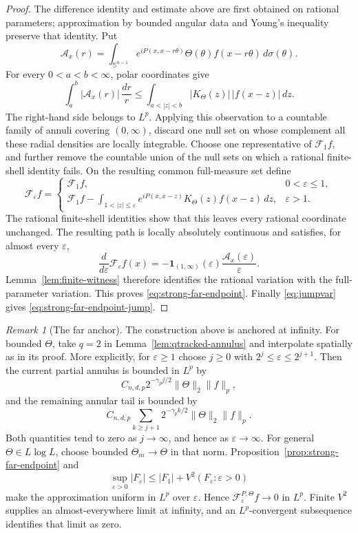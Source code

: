 \documentclass[11pt]{article}
\numberwithin{equation}{section}
\theoremstyle{remark}
\newtheorem{remark}[theorem]{Remark}
\theoremstyle{definition}
\newcommand{\Sph}{\mathbb S}
\newcommand{\cF}{\mathcal F}
\newcommand{\norm}[1]{\lVert #1\rVert}
\begin{document}
\begin{proof}
The difference identity and estimate above are first obtained on rational
parameters; approximation by bounded angular data and Young's inequality
preserve that identity.  Put
\[
 \mathcal A_x(r)=\int_{\Sph^{n-1}}
 e^{iP(x,x-r\theta)}\Theta(\theta)f(x-r\theta)\,d\sigma(\theta).
\]
For every $0<a<b<\infty$, polar coordinates give
\[
 \int_a^b|\mathcal A_x(r)|\,\frac{dr}{r}
 \le\int_{a<|z|<b}|K_\Theta(z)|\,|f(x-z)|\,dz.
\]
The right-hand side belongs to $L^p$.  Applying this observation to a
countable family of annuli covering $(0,\infty)$, discard one null set on
whose complement all these radial densities are locally integrable.
Choose one representative of $\cF_1f$, and further remove the countable
union of the null sets on which a rational finite-shell identity fails.
On the resulting common full-measure set define
\[
 \cF_\varepsilon f=
 \begin{cases}
  \cF_1f,&0<\varepsilon\le1,\\[1ex]
  \displaystyle
  \cF_1f-\int_{1<|z|\le\varepsilon}
  e^{iP(x,x-z)}K_\Theta(z)f(x-z)\,dz,&\varepsilon>1.
 \end{cases}
\]
The rational finite-shell identities show that this leaves every rational
coordinate unchanged.  The resulting path is locally absolutely
continuous and satisfies, for almost every $\varepsilon$,
\[
 \frac{d}{d\varepsilon}\cF_\varepsilon f(x)
 =-\mathbf1_{(1,\infty)}(\varepsilon)
   \frac{\mathcal A_x(\varepsilon)}{\varepsilon}.
\]
Lemma~\ref{lem:finite-witness} therefore identifies the rational
variation with the full-parameter variation.  This proves
\eqref{eq:strong-far-endpoint}.
Finally \eqref{eq:jumpvar} gives
\eqref{eq:strong-far-endpoint-jump}.
\end{proof}

\begin{remark}[The far anchor]
\label{rem:strong-far-anchor}
The construction above is anchored at infinity.  For bounded $\Theta$,
take $q=2$ in Lemma~\ref{lem:qtracked-annulus} and interpolate spatially
as in its proof.  More explicitly, for $\varepsilon\ge1$ choose
$j\ge0$ with $2^j\le\varepsilon\le2^{j+1}$.  Then the current partial annulus is bounded
in $L^p$ by
\[
 C_{n,d,p}2^{-\gamma_pj/2}\norm\Theta_2\norm f_p,
\]
and the remaining annular tail is bounded by
\[
 C_{n,d,p}\sum_{k\ge j+1}2^{-\gamma_pk/2}
 \norm\Theta_2\norm f_p.
\]
Both quantities tend to zero as $j\to\infty$, and hence as
$\varepsilon\to\infty$.
For general $\Theta\in L\log L$, choose bounded
$\Theta_m\to\Theta$ in that norm.
Proposition~\ref{prop:strong-far-endpoint} and
\[
 \sup_{\varepsilon>0}|F_\varepsilon|
 \leq |F_1|+V^2(F_\varepsilon:\varepsilon>0)
\]
make the approximation uniform in $L^p$ over $\varepsilon$.  Hence
$\cF^{P,\Theta}_\varepsilon f\to0$ in $L^p$.  Finite \(V^2\) supplies an
almost-everywhere limit at infinity, and an \(L^p\)-convergent subsequence
identifies that limit as zero.
\end{remark}
\end{document}
